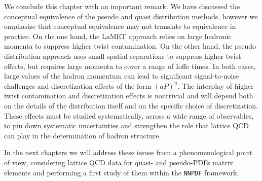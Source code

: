 We conclude this chapter with an important remark.
We have discussed the conceptual equivalence of the pseudo and quasi distribution methods,
however we emphasize that conceptual equivalence may not translate to
equivalence in practice. On the one hand, the LaMET approach relies on large
hadronic momenta to suppress higher twist contamination. On the other hand, the
pseudo distribution approach uses small spatial separations to suppress higher
twist effects, but requires large momenta to cover a range of Ioffe times. In
both cases, large values of the hadron momentum can lead to significant
signal-to-noise challenges and discretization effects of the form $(aP)^n$. The
interplay of higher twist contamination and discretization effects is nontrivial
and will depend both on the details of the distribution itself and on the
specific choice of discretization. These effects must be studied systematically,
across a wide range of observables, to pin down systematic uncertainties and
strengthen the role that lattice QCD can play in the determination of hadron
structure.

In the next chapters we will address these issues from a phenomenological point of view,
considering lattice QCD data for quasi- and pseudo-PDFs matrix elements and 
performing a first study of them within the {\tt NNPDF} framework.
